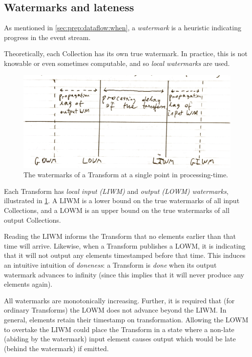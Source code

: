\subsection{Watermarks and lateness}\label{sec:impl:dataflow:watermarks}\label{sec:impl:dataflow:lateness}

As mentioned in \cref{sec:prep:dataflow:when}, a \emph{watermark} is a heuristic indicating progress in the event stream.

Theoretically, each Collection has its own true watermark.
In practice, this is not knowable or even sometimes computable, and so \emph{local watermarks} are used.

\begin{figure}[t]
	\includegraphics[width=\textwidth]{images/temp/lwm-transform-instantaneous}
	\caption{The watermarks of a Transform at a single point in processing-time.}
	\label{fig:impl:lwm-instantaneous}
\end{figure}

Each Transform has \emph{local input (LIWM)} and \emph{output (LOWM) watermarks}, illustrated in \cref{fig:impl:lwm-instantaneous}.
A LIWM is a lower bound on the true watermarks of all input Collections, and a LOWM is an upper bound on the true watermarks of all output Collections.

Reading the LIWM informs the Transform that no elements earlier than that time will arrive.
Likewise, when a Transform publishes a LOWM, it is indicating that it will not output any elements timestamped before that time. This induces an intuitive intuition of \emph{doneness}: a Transform is \emph{done} when its output watermark advances to infinity (since this implies that it will never produce any elements again).

All watermarks are monotonically increasing.
Further, it is required that (for ordinary Transforms) the LOWM does not advance beyond the LIWM.
In general, elements retain their timestamp on transformation.
Allowing the LOWM to overtake the LIWM could place the Transform in a state where a non-late (abiding by the watermark) input element causes output which would be late (behind the watermark) if emitted.

